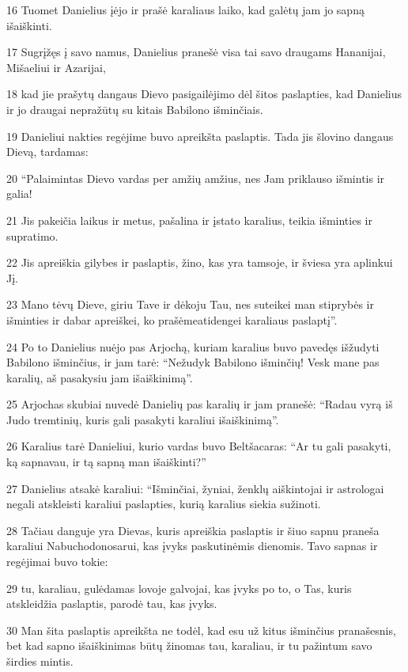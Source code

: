 \par 16 Tuomet Danielius įėjo ir prašė karaliaus laiko, kad galėtų jam jo sapną išaiškinti. 
\par 17 Sugrįžęs į savo namus, Danielius pranešė visa tai savo draugams Hananijai, Mišaeliui ir Azarijai, 
\par 18 kad jie prašytų dangaus Dievo pasigailėjimo dėl šitos paslapties, kad Danielius ir jo draugai nepražūtų su kitais Babilono išminčiais. 
\par 19 Danieliui nakties regėjime buvo apreikšta paslaptis. Tada jis šlovino dangaus Dievą, tardamas: 
\par 20 “Palaimintas Dievo vardas per amžių amžius, nes Jam priklauso išmintis ir galia! 
\par 21 Jis pakeičia laikus ir metus, pašalina ir įstato karalius, teikia išminties ir supratimo. 
\par 22 Jis apreiškia gilybes ir paslaptis, žino, kas yra tamsoje, ir šviesa yra aplinkui Jį. 
\par 23 Mano tėvų Dieve, giriu Tave ir dėkoju Tau, nes suteikei man stiprybės ir išminties ir dabar apreiškei, ko prašėme­atidengei karaliaus paslaptį”. 
\par 24 Po to Danielius nuėjo pas Arjochą, kuriam karalius buvo pavedęs išžudyti Babilono išminčius, ir jam tarė: “Nežudyk Babilono išminčių! Vesk mane pas karalių, aš pasakysiu jam išaiškinimą”. 
\par 25 Arjochas skubiai nuvedė Danielių pas karalių ir jam pranešė: “Radau vyrą iš Judo tremtinių, kuris gali pasakyti karaliui išaiškinimą”. 
\par 26 Karalius tarė Danieliui, kurio vardas buvo Beltšacaras: “Ar tu gali pasakyti, ką sapnavau, ir tą sapną man išaiškinti?” 
\par 27 Danielius atsakė karaliui: “Išminčiai, žyniai, ženklų aiškintojai ir astrologai negali atskleisti karaliui paslapties, kurią karalius siekia sužinoti. 
\par 28 Tačiau danguje yra Dievas, kuris apreiškia paslaptis ir šiuo sapnu praneša karaliui Nabuchodonosarui, kas įvyks paskutinėmis dienomis. Tavo sapnas ir regėjimai buvo tokie: 
\par 29 tu, karaliau, gulėdamas lovoje galvojai, kas įvyks po to, o Tas, kuris atskleidžia paslaptis, parodė tau, kas įvyks. 
\par 30 Man šita paslaptis apreikšta ne todėl, kad esu už kitus išminčius pranašesnis, bet kad sapno išaiškinimas būtų žinomas tau, karaliau, ir tu pažintum savo širdies mintis. 
